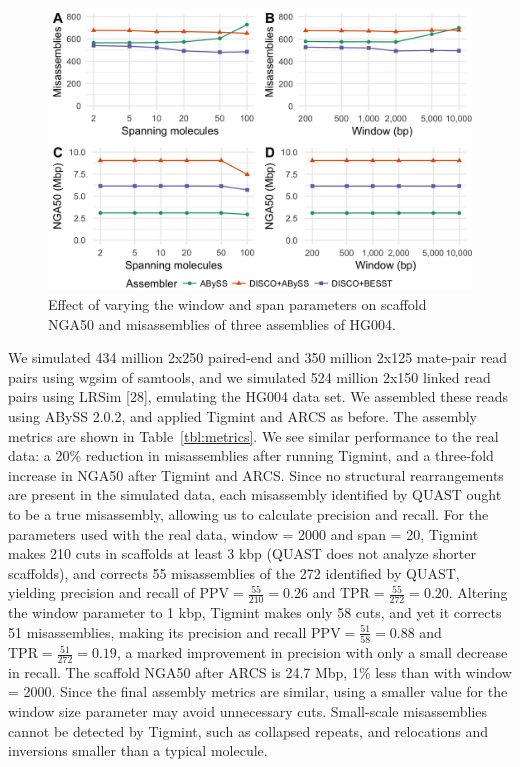 \documentclass{bmcart}
\begin{document}
\begin{figure}[!htbp]
\hypertarget{fig:parameters}{%
\centering
\includegraphics[width=4.8in]{figures/parameters.png}
\caption{Effect of varying the window and span parameters on scaffold NGA50 and misassemblies of three assemblies of HG004.}\label{fig:parameters}
}
\end{figure}

We simulated 434 million 2x250 paired-end and 350 million 2x125 mate-pair read pairs using wgsim of samtools, and we simulated 524 million 2x150 linked read pairs using LRSim {[}28{]}, emulating the HG004 data set. We assembled these reads using ABySS 2.0.2, and applied Tigmint and ARCS as before. The assembly metrics are shown in Table~\ref{tbl:metrics}. We see similar performance to the real data: a 20\% reduction in misassemblies after running Tigmint, and a three-fold increase in NGA50 after Tigmint and ARCS. Since no structural rearrangements are present in the simulated data, each misassembly identified by QUAST ought to be a true misassembly, allowing us to calculate precision and recall. For the parameters used with the real data, window = 2000 and span = 20, Tigmint makes 210 cuts in scaffolds at least 3 kbp (QUAST does not analyze shorter scaffolds), and corrects 55 misassemblies of the 272 identified by QUAST, yielding precision and recall of \(\textrm{PPV} = \frac{55}{210} = 0.26\) and \(\textrm{TPR} = \frac{55}{272} = 0.20\). Altering the window parameter to 1 kbp, Tigmint makes only 58 cuts, and yet it corrects 51 misassemblies, making its precision and recall \(\textrm{PPV} = \frac{51}{58} = 0.88\) and \(\textrm{TPR} = \frac{51}{272} = 0.19\), a marked improvement in precision with only a small decrease in recall. The scaffold NGA50 after ARCS is 24.7 Mbp, 1\% less than with window = 2000. Since the final assembly metrics are similar, using a smaller value for the window size parameter may avoid unnecessary cuts. Small-scale misassemblies cannot be detected by Tigmint, such as collapsed repeats, and relocations and inversions smaller than a typical molecule.
\end{document}
